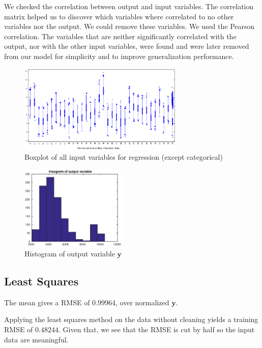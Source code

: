 \documentclass{article} %
\begin{document}
We checked the correlation between output and input variables. The correlation matrix helped us to discover which variables where correlated to no other variables nor the output. We could remove these variables. We used the Pearson correlation. The variables that are neither significantly correlated with the output, nor with the other input variables, were found and were later removed from our model for simplicity and to improve generalization performance.
\begin{figure}
\centering
\includegraphics[width=0.7\textwidth]{images/boxplot_xtrain_reg.eps}
\caption{Boxplot of all input variables for regression (except categorical)}
\label{fig:boxplot}
\end{figure}

\begin{figure}
\centering
\includegraphics[width=0.45\textwidth]{images/hist_output.eps}
\caption{Histogram of output variable $\mathbf{y}$}
\label{fig:outputhist}
\end{figure}

\subsection{Least Squares}

The mean gives a RMSE of 0.99964, over normalized $\mathbf{y}$.

Applying the least squares method on the data without cleaning yields a training RMSE of $0.48244$. Given that, we see that the RMSE is cut by half so the input data are meaningful.
\end{document}

